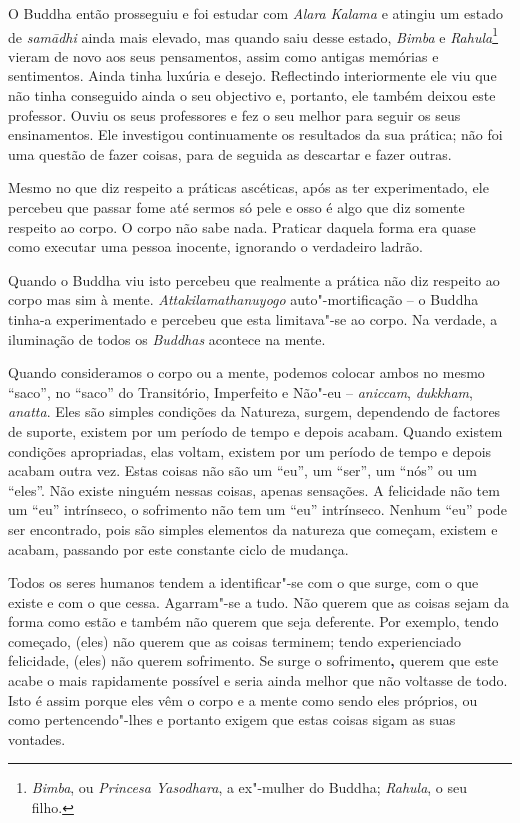 O Buddha então prosseguiu e foi estudar com \emph{Alara} \emph{Kalama} e
atingiu um estado de \emph{samādhi} ainda mais elevado, mas quando saiu
desse estado, \emph{Bimba} e \emph{Rahula}\footnote{%
  \emph{Bimba}, ou \emph{Princesa Yasodhara}, a ex"-mulher do
  Buddha; \emph{Rahula}, o seu filho.
}
vieram de novo aos seus
pensamentos, assim como antigas memórias e sentimentos. Ainda tinha
luxúria e desejo. Reflectindo interiormente ele viu que não tinha
conseguido ainda o seu objectivo e, portanto, ele também deixou este
professor. Ouviu os seus professores e fez o seu melhor para seguir os
seus ensinamentos. Ele investigou continuamente os resultados da sua
prática; não foi uma questão de fazer coisas, para de seguida as
descartar e fazer outras.

Mesmo no que diz respeito a práticas ascéticas, após as ter
experimentado, ele percebeu que passar fome até sermos só pele e osso é
algo que diz somente respeito ao corpo. O corpo não sabe nada. Praticar
daquela forma era quase como executar uma pessoa inocente, ignorando o
verdadeiro ladrão.

Quando o Buddha viu isto percebeu que realmente a prática não diz
respeito ao corpo mas sim à mente. \emph{Attakilamathanuyogo}
auto"-mortificação -- o Buddha tinha-a experimentado e percebeu que esta
limitava"-se ao corpo. Na verdade, a iluminação de todos os
\emph{Buddhas} acontece na mente.

Quando consideramos o corpo ou a mente, podemos colocar ambos no mesmo
``saco'', no ``saco'' do Transitório, Imperfeito e Não"-eu --
\emph{aniccam}, \emph{dukkham}, \emph{anatta}. Eles são simples
condições da Natureza, surgem, dependendo de factores de suporte,
existem por um período de tempo e depois acabam. Quando existem
condições apropriadas, elas voltam, existem por um período de tempo e
depois acabam outra vez. Estas coisas não são um ``eu'', um ``ser'', um
``nós'' ou um ``eles''. Não existe ninguém nessas coisas, apenas
sensações. A felicidade não tem um ``eu'' intrínseco, o sofrimento não
tem um ``eu'' intrínseco. Nenhum ``eu'' pode ser encontrado, pois são
simples elementos da natureza que começam, existem e acabam, passando
por este constante ciclo de mudança.

Todos os seres humanos tendem a identificar"-se com o que surge, com o
que existe e com o que cessa. Agarram"-se a tudo. Não querem que as
coisas sejam da forma como estão e também não querem que seja deferente.
Por exemplo, tendo começado, (eles) não querem que as coisas terminem;
tendo experienciado felicidade, (eles) não querem sofrimento. Se surge o
sofrimento\textbf{,} querem que este acabe o mais rapidamente possível e
seria ainda melhor que não voltasse de todo. Isto é assim porque eles
vêm o corpo e a mente como sendo eles próprios, ou como pertencendo"-lhes
e portanto exigem que estas coisas sigam as suas vontades.

